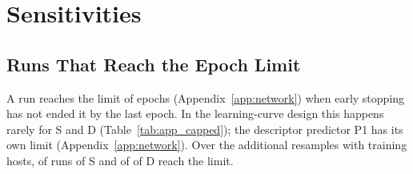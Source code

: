 \section{Sensitivities}
\label{app:sens}

\subsection{Runs That Reach the Epoch Limit}

A run reaches the limit of \numNetCapMaxEpochs{} epochs (Appendix~\ref{app:network}) when early stopping has not ended it by the last epoch. In the learning-curve design this happens rarely for S and D (Table~\ref{tab:app_capped}); the descriptor predictor P1 has its own limit (Appendix~\ref{app:network}). Over the additional resamples with \numCfgBudgetsMax{} training hosts, \numPrecisionABFourHundredBSixHundredFiftyFourDescriptiveCappedPrecisionSixHundredFiftyFourVTwoSNCapped{} of \numPrecisionABFourHundredBSixHundredFiftyFourDescriptiveCappedPrecisionSixHundredFiftyFourVTwoSNRuns{} runs of S and \numPrecisionABFourHundredBSixHundredFiftyFourDescriptiveCappedPrecisionSixHundredFiftyFourVTwoDNCapped{} of \numPrecisionABFourHundredBSixHundredFiftyFourDescriptiveCappedPrecisionSixHundredFiftyFourVTwoDNRuns{} of D reach the limit.

